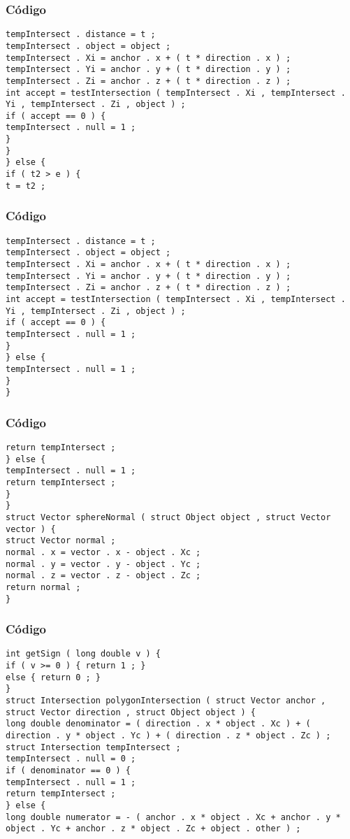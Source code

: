 \documentclass{beamer}
\begin{document}
\begin{frame}[fragile]
\frametitle{C\'odigo}
\begin{verbatim}
tempIntersect . distance = t ; 
tempIntersect . object = object ; 
tempIntersect . Xi = anchor . x + ( t * direction . x ) ; 
tempIntersect . Yi = anchor . y + ( t * direction . y ) ; 
tempIntersect . Zi = anchor . z + ( t * direction . z ) ; 
int accept = testIntersection ( tempIntersect . Xi , tempIntersect . Yi , tempIntersect . Zi , object ) ; 
if ( accept == 0 ) { 
tempIntersect . null = 1 ; 
} 
} 
} else { 
if ( t2 > e ) { 
t = t2 ; 
\end{verbatim}
\end{frame}
\begin{frame}[fragile]
\frametitle{C\'odigo}
\begin{verbatim}
tempIntersect . distance = t ; 
tempIntersect . object = object ; 
tempIntersect . Xi = anchor . x + ( t * direction . x ) ; 
tempIntersect . Yi = anchor . y + ( t * direction . y ) ; 
tempIntersect . Zi = anchor . z + ( t * direction . z ) ; 
int accept = testIntersection ( tempIntersect . Xi , tempIntersect . Yi , tempIntersect . Zi , object ) ; 
if ( accept == 0 ) { 
tempIntersect . null = 1 ; 
} 
} else { 
tempIntersect . null = 1 ; 
} 
} 
\end{verbatim}
\end{frame}
\begin{frame}[fragile]
\frametitle{C\'odigo}
\begin{verbatim}
return tempIntersect ; 
} else { 
tempIntersect . null = 1 ; 
return tempIntersect ; 
} 
} 
struct Vector sphereNormal ( struct Object object , struct Vector vector ) { 
struct Vector normal ; 
normal . x = vector . x - object . Xc ; 
normal . y = vector . y - object . Yc ; 
normal . z = vector . z - object . Zc ; 
return normal ; 
} 
\end{verbatim}
\end{frame}
\begin{frame}[fragile]
\frametitle{C\'odigo}
\begin{verbatim}
int getSign ( long double v ) { 
if ( v >= 0 ) { return 1 ; } 
else { return 0 ; } 
} 
struct Intersection polygonIntersection ( struct Vector anchor , struct Vector direction , struct Object object ) { 
long double denominator = ( direction . x * object . Xc ) + ( direction . y * object . Yc ) + ( direction . z * object . Zc ) ; 
struct Intersection tempIntersect ; 
tempIntersect . null = 0 ; 
if ( denominator == 0 ) { 
tempIntersect . null = 1 ; 
return tempIntersect ; 
} else { 
long double numerator = - ( anchor . x * object . Xc + anchor . y * object . Yc + anchor . z * object . Zc + object . other ) ; 
\end{verbatim}
\end{frame}
\end{document}

